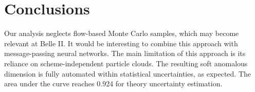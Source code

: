 \section{Conclusions}\label{sec:conclusions}

Our analysis neglects flow-based Monte Carlo samples, which may become
relevant at Belle II. It would be interesting to combine this approach
with message-passing neural networks. The main limitation of this
approach is its reliance on scheme-independent particle clouds. The
resulting soft anomalous dimension is fully automated within statistical
uncertainties, as expected. The area under the curve reaches 0.924 for
theory uncertainty estimation.

